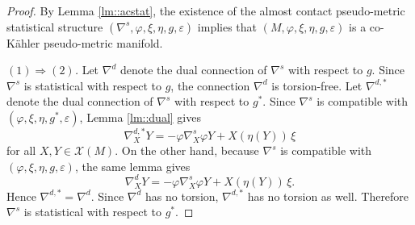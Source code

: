 \documentclass[12pt,a4paper,final]{amsart}
\numberwithin{equation}{section}
\theoremstyle{df}
\newcommand{\X}{\mathcal{X}}
\newcommand{\XM}{\X(M)}
\newcommand{\eps}{\varepsilon}
\begin{document}
\begin{proof}
By Lemma \ref{lm::acstat}, the existence of the almost contact pseudo-metric
statistical structure $(\nabla^s,\varphi,\xi,\eta,g,\eps)$ implies that
$(M,\varphi,\xi,\eta,g,\eps)$ is a co-K\"ahler pseudo-metric manifold.

\medskip

\noindent\emph{$(1)\Rightarrow(2)$.}
Let $\nabla^d$ denote the dual connection of $\nabla^s$ with respect to $g$.
Since $\nabla^s$ is statistical with respect to $g$, the connection $\nabla^d$
is torsion-free. Let $\nabla^{d,\ast}$ denote the dual connection of $\nabla^s$
with respect to $g^\ast$. Since $\nabla^s$ is compatible with
$(\varphi,\xi,\eta,g^\ast,\eps)$, Lemma \ref{lm::dual} gives
$$
\nabla^{d,\ast}_XY=-\varphi\nabla^s_X\varphi Y+X(\eta(Y))\,\xi
$$
for all $X,Y\in\XM$. On the other hand, because $\nabla^s$ is compatible with
$(\varphi,\xi,\eta,g,\eps)$, the same lemma gives
$$
\nabla^d_XY=-\varphi\nabla^s_X\varphi Y+X(\eta(Y))\,\xi.
$$
Hence $\nabla^{d,\ast}=\nabla^d$.
Since $\nabla^d$ has no torsion, $\nabla^{d,\ast}$ has no torsion as well.
Therefore $\nabla^s$ is statistical with respect to $g^\ast$.

\medskip


\end{proof}
\end{document}
